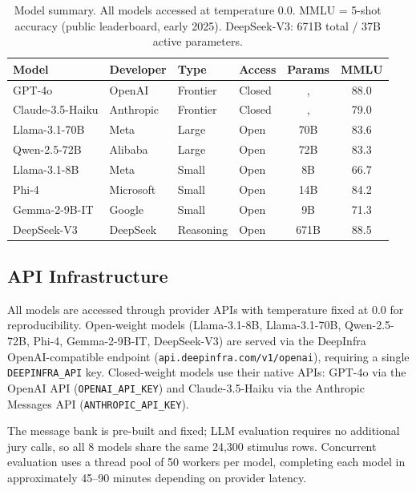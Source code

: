 \documentclass[11pt]{article}
\begin{document}
\begin{table}[h]
\centering
\small
\setlength{\tabcolsep}{4pt}
\begin{tabular}{llllcc}
\toprule
\textbf{Model} & \textbf{Developer} & \textbf{Type} & \textbf{Access} & \textbf{Params} & \textbf{MMLU} \\
\midrule
GPT-4o \citep{achiam2023gpt}              & OpenAI    & Frontier & Closed  &,   & 88.0 \\
Claude-3.5-Haiku \citep{bai2022constitutional}   & Anthropic & Frontier & Closed  &,   & 79.0 \\
\midrule
Llama-3.1-70B \citep{dubey2024llama}      & Meta      & Large    & Open    & 70B   & 83.6 \\
Qwen-2.5-72B \citep{yang2024qwen2}        & Alibaba   & Large    & Open    & 72B   & 83.3 \\
\midrule
Llama-3.1-8B \citep{dubey2024llama}       & Meta      & Small    & Open    & 8B    & 66.7 \\
Phi-4 \citep{abdin2024phi}                & Microsoft & Small    & Open    & 14B   & 84.2 \\
Gemma-2-9B-IT \citep{team2024gemma}       & Google    & Small    & Open    & 9B    & 71.3 \\
\midrule
DeepSeek-V3 \citep{liu2024deepseek}       & DeepSeek  & Reasoning & Open   & 671B  & 88.5 \\
\bottomrule
\end{tabular}
\caption{Model summary. All models accessed at temperature 0.0. MMLU = 5-shot accuracy \citep{hendrycks2021measuring} (public leaderboard, early 2025). DeepSeek-V3: 671B total / 37B active parameters.}
\label{tab:models}
\end{table}

\subsection{API Infrastructure}

All models are accessed through provider APIs with temperature fixed at 0.0 for reproducibility. Open-weight models (Llama-3.1-8B, Llama-3.1-70B, Qwen-2.5-72B, Phi-4, Gemma-2-9B-IT, DeepSeek-V3) are served via the DeepInfra OpenAI-compatible endpoint (\texttt{api.deepinfra.com/v1/openai}), requiring a single \texttt{DEEPINFRA\_API} key. Closed-weight models use their native APIs: GPT-4o via the OpenAI API (\texttt{OPENAI\_API\_KEY}) and Claude-3.5-Haiku via the Anthropic Messages API (\texttt{ANTHROPIC\_API\_KEY}).

The message bank is pre-built and fixed; LLM evaluation requires no additional jury calls, so all 8 models share the same 24{,}300 stimulus rows. Concurrent evaluation uses a thread pool of 50 workers per model, completing each model in approximately 45--90 minutes depending on provider latency.
\end{document}
